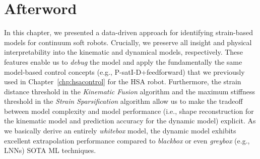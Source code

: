 \section*{Afterword}
In this chapter, we presented a data-driven approach for identifying strain-based models for continuum soft robots. Crucially, we preserve all insight and physical interpretability into the kinematic and dynamical models, respectively. These features enable us to \emph{debug} the model and apply the fundamentally the same model-based control concepts (e.g., P-satI-D+feedforward) that we previously used in Chapter~\ref{chp:hsacontrol} for the \gls{HSA} robot. Furthermore, the strain distance threshold in the \emph{Kinematic Fusion} algorithm and the maximum stiffness threshold in the \emph{Strain Sparsification} algorithm allow us to make the tradeoff between model complexity and model performance (i.e., shape reconstruction for the kinematic model and prediction accuracy for the dynamic model) explicit.
As we basically derive an entirely \emph{whitebox} model, the dynamic model exhibits excellent extrapolation performance compared to \emph{blackbox} or even \emph{greybox} (e.g., \glspl{LNN}) \gls{SOTA} \gls{ML} techniques.
